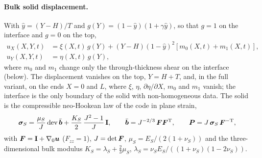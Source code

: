 \paragraph{Bulk solid displacement.}
With $\hat y = (Y-H)/T$ and $g(Y) = (1-\hat y)(1+\gamma\hat y)$, so that $g = 1$ on the interface and $g = 0$ on the top,
\begin{align}
	u_X(X,Y,t) &= \xi(X,t)\,g(Y) + (Y-H)(1-\hat y)^2\left[m_0(X,t) + m_1(X,t)\right], \\
	u_Y(X,Y,t) &= \eta(X,t)\,g(Y),
\end{align}
where $m_0$ and $m_1$ change only the through-thickness shear on the interface (below).
The displacement vanishes on the top, $Y = H+T$, and, in the full variant, on the ends $X = 0$ and $L$, where $\xi$, $\eta$, $\partial\eta/\partial X$, $m_0$ and $m_1$ vanish; the interface is the only boundary of the solid with non-homogeneous data.
The solid is the compressible neo-Hookean law of the code in plane strain,
\begin{equation}
	\boldsymbol{\sigma}_S = \frac{\mu_S}{J}\,\mathrm{dev}\,\bar{\boldsymbol{b}} + \frac{K_S}{2}\,\frac{J^2-1}{J}\,\mathbf{I},
	\qquad
	\bar{\boldsymbol{b}} = J^{-2/3}\,\boldsymbol{F}\boldsymbol{F}^{\mathrm{T}},
	\qquad
	\boldsymbol{P} = J\,\boldsymbol{\sigma}_S\,\boldsymbol{F}^{-\mathrm{T}},
\end{equation}
with $\boldsymbol{F} = \mathbf{I} + \nabla_0\boldsymbol{u}$ ($F_{zz} = 1$), $J = \det\boldsymbol{F}$, $\mu_S = E_S/(2(1+\nu_S))$ and the three-dimensional bulk modulus $K_S = \lambda_S + \tfrac23\mu_S$, $\lambda_S = \nu_S E_S/((1+\nu_S)(1-2\nu_S))$.

